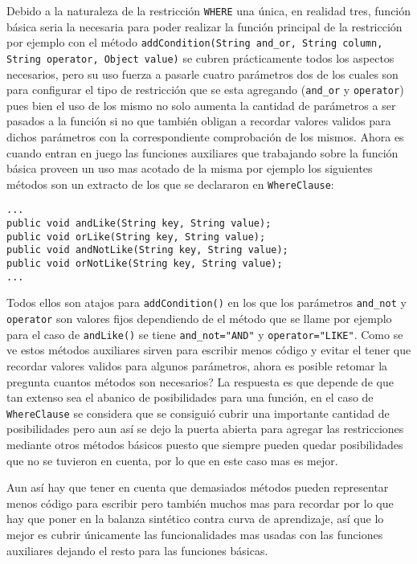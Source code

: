 Debido a la naturaleza de la restricción \verb=WHERE= una única, en realidad tres, función básica seria la necesaria para poder realizar la función principal de la restricción por ejemplo con el método \verb=addCondition(String and_or, String column, String operator, Object value)= se cubren prácticamente todos los aspectos necesarios, pero su uso fuerza a pasarle cuatro parámetros dos de los cuales son para configurar el tipo de restricción que se esta agregando (\verb=and_or= y \verb=operator=) pues bien el uso de los mismo no solo aumenta la cantidad de parámetros a ser pasados a la función si no que también obligan a recordar valores validos para dichos parámetros con la correspondiente comprobación de los mismos. Ahora es cuando entran en juego las funciones auxiliares que trabajando sobre la función básica proveen un uso mas acotado de la misma por ejemplo los siguientes métodos son un extracto de los que se declararon en \verb=WhereClause=:
%
\begin{lstlisting}[title=Extracto de WhereClause]
...
public void andLike(String key, String value);
public void orLike(String key, String value);
public void andNotLike(String key, String value);
public void orNotLike(String key, String value);
...
\end{lstlisting}
%
Todos ellos son atajos para \verb=addCondition()= en los que los parámetros \verb=and_not= y \verb=operator= son valores fijos dependiendo de el método que se llame por ejemplo para el caso de \verb=andLike()= se tiene \verb|and_not="AND"|  y \verb|operator="LIKE"|. Como se ve estos métodos auxiliares sirven para escribir menos código y evitar el tener que recordar valores validos para algunos parámetros, ahora es posible retomar la pregunta cuantos métodos son necesarios? La respuesta es que depende de que tan extenso sea el abanico de posibilidades para una función, en el caso de \verb=WhereClause= se considera que se consiguió cubrir una importante cantidad de posibilidades pero aun así se dejo la puerta abierta para agregar las restricciones mediante otros métodos básicos puesto que siempre pueden quedar posibilidades que no se tuvieron en cuenta, por lo que en este caso mas es mejor.

Aun así hay que tener en cuenta que demasiados métodos pueden representar menos código para escribir pero también muchos mas para recordar por lo que hay que poner en la balanza sintético contra curva de aprendizaje, así que lo mejor es cubrir únicamente las  funcionalidades mas usadas con las funciones auxiliares dejando el resto para las funciones básicas.
%

